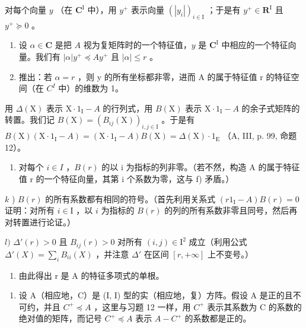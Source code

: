 对每个向量 \(y\) （在 \(\mathbf{C}^{\mathrm{I}}\) 中），用 \(y^{+}\) 表示向量 \((|y_{i}|)_{i\in \mathrm{I}}\) ；于是有 \(y^{+}\in \mathbf{R}^{\mathrm{I}}\) 且 \(y^{+}\succcurlyeq 0\) 。

\begin{enumerate}
\def\labelenumi{\alph{enumi})}
\setcounter{enumi}{7}
\item
  设 \(\alpha \in \mathbf{C}\) 是把 \(A\) 视为复矩阵时的一个特征值，\(y\) 是 \(\mathbf{C}^{\mathrm{I}}\) 中相应的一个特征向量。我们有 \(|\alpha|y^{+} \preccurlyeq Ay^{+}\) 且 \(|\alpha| \leqslant r\) 。
\item
  推出：若 \(\alpha = r\) ，则 y 的所有坐标都非零，进而 A 的属于特征值 r 的特征空间（在 \(C^{I}\) 中）的维数为 1。
\end{enumerate}

用 \(\Delta(\mathrm{X})\) 表示 \(\mathrm{X} \cdot 1_{\mathrm{I}} - A\) 的行列式，用 \(B(\mathrm{X})\) 表示 \(\mathrm{X} \cdot 1_{\mathrm{I}} - A\) 的余子式矩阵的转置。我们记 \(B(\mathrm{X}) = (B_{ij}(\mathrm{X}))_{i,j \in \mathrm{I}}\) 。于是有 \(B(\mathrm{X})(\mathrm{X} \cdot 1_{\mathrm{I}} - A) = (\mathrm{X} \cdot 1_{\mathrm{I}} - A)B(\mathrm{X}) = \Delta(\mathrm{X}) \cdot 1_{\mathrm{E}}\) （A, III, p. 99, 命题 12）。

\begin{enumerate}
\def\labelenumi{\alph{enumi})}
\setcounter{enumi}{9}
\tightlist
\item
  对每个 \(i \in I\) ，\(B(r)\) 的以 i 为指标的列非零。（若不然，构造 A 的属于特征值 r 的一个特征向量，其第 i 个系数为零，这与 f) 矛盾。）
\end{enumerate}

\(k\) ) \(B(r)\) 的所有系数都有相同的符号。（首先利用关系式 \((r1_{\mathrm{I}} - A)B(r) = 0\) 证明：对所有 \(i\in \mathrm{I}\) ，以 \(i\) 为指标的 \(B(r)\) 的列的所有系数非零且同号，然后再对转置进行论证。）

\(l)\) \(\Delta'(r) > 0\) 且 \(B_{ij}(r) > 0\) 对所有 \((i,j) \in \mathrm{I}^2\) 成立（利用公式 \(\Delta'(X) = \sum_i B_{ii}(X)\) ，并注意 \(\Delta'\) 在区间 \([r, +\infty]\) 上不变号。）

\begin{enumerate}
\def\labelenumi{\alph{enumi})}
\setcounter{enumi}{12}
\tightlist
\item
  由此得出 r 是 A 的特征多项式的单根。
\end{enumerate}

\begin{enumerate}
\def\labelenumi{\arabic{enumi})}
\setcounter{enumi}{12}
\tightlist
\item
  设 A（相应地，C）是 (I, I) 型的实（相应地，复）方阵。假设 A 是正的且不可约，并且 \(C^{+} \preccurlyeq A\) ，这里与习题 12 一样，用 \(C^{+}\) 表示其系数为 C 的系数的绝对值的矩阵，而记号 \(C^{+} \preccurlyeq A\) 表示 \(A - C^{+}\) 的系数都是正的。
\end{enumerate}

